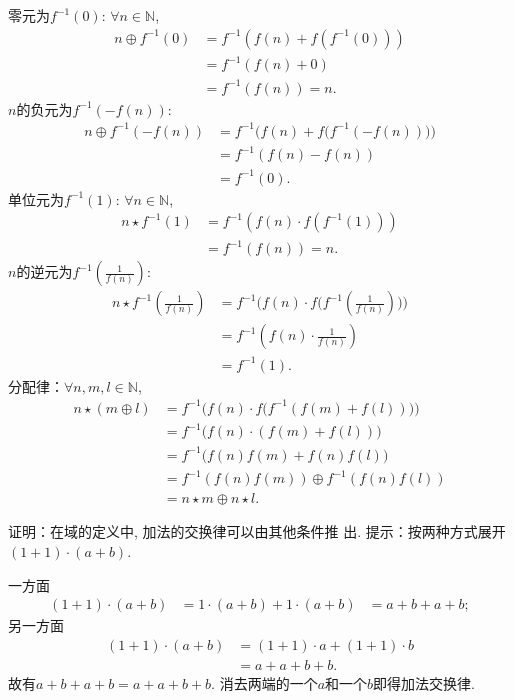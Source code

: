 \begin{solution}
    零元为$f^{-1}(0)$: $\forall n \in \mathbb{N}$,
\[
\begin{aligned}
    n \oplus f^{-1}(0) &= f^{-1}(f(n) + f(f^{-1}(0)))\\
    &= f^{-1}(f(n) + 0)\\
    &= f^{-1}(f(n)) = n.
\end{aligned}
\]
    $n$的负元为$f^{-1}(-f(n))$:
\[
\begin{aligned}
    n \oplus f^{-1}(-f(n)) &= f^{-1}\biggl(f(n) + f\bigl(f^{-1}(-f(n))\bigr)\biggr)\\
    &= f^{-1}(f(n) - f(n))\\
    &= f^{-1}(0).
\end{aligned}
\]
    单位元为$f^{-1}(1)$: $\forall n \in \mathbb{N}$,
\[
\begin{aligned}
    n \star f^{-1}(1) &= f^{-1}(f(n) \cdot f(f^{-1}(1)))\\
    &= f^{-1}(f(n)) = n.
\end{aligned}
\]
    $n$的逆元为$f^{-1}(\frac1{f(n)})$:
\[
\begin{aligned}
    n \star f^{-1}(\frac{1}{f(n)}) &= f^{-1}\biggl(f(n) \cdot f\bigl(f^{-1}(\frac{1}{f(n)})\bigr)\biggr)\\
    &= f^{-1}(f(n) \cdot \frac{1}{f(n)})\\
    &= f^{-1}(1).
\end{aligned}
\]
    分配律：$\forall n, m, l \in \mathbb{N}$,
\[
\begin{aligned}
    n \star (m \oplus l) &= f^{-1}\biggl(f(n) \cdot f\bigl(f^{-1}(f(m) + f(l))\bigr)\biggr)\\
    &= f^{-1}\bigl(f(n) \cdot (f(m) + f(l))\bigr)\\
    &= f^{-1}\bigl(f(n)f(m) + f(n)f(l)\bigr)\\
    &= f^{-1}(f(n)f(m)) \oplus f^{-1}(f(n)f(l))\\
    &= n \star m \oplus n \star l.
\end{aligned}
\]
\end{solution}

\begin{problem}\label{ex:1.1.5}
    证明：在域的定义中, 加法的交换律可以由其他条件推
出. 提示：按两种方式展开 $(1 + 1) \cdot (a + b)$.
\end{problem}

\begin{solution}
    一方面
\[
\begin{aligned}
    (1 + 1) \cdot (a + b) &= 1 \cdot (a + b) + 1 \cdot (a + b)
    &= a + b + a + b;
\end{aligned}    
\]
    另一方面
\[
\begin{aligned}
    (1 + 1) \cdot (a + b) &= (1 + 1) \cdot a + (1 + 1) \cdot b\\
    &= a + a + b + b.
\end{aligned}
\]
故有$a + b + a + b = a + a + b + b$.
消去两端的一个$a$和一个$b$即得加法交换律.
\end{solution}


